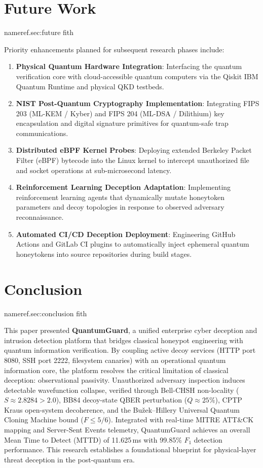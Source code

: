 \documentclass[journal,10pt]{IEEEtran}
\makeatletter
\let\orig@label\label
\def\label#1{%
  \orig@label{#1}%
  \pdfdest name{ref.#1} fith\relax
}
\makeatother
\begin{document}
\section{Future Work}\label{sec:future}
Priority enhancements planned for subsequent research phases include:
\begin{enumerate}
    \item \textbf{Physical Quantum Hardware Integration}: Interfacing the quantum verification core with cloud-accessible quantum computers via the Qiskit IBM Quantum Runtime and physical QKD testbeds.
    \item \textbf{NIST Post-Quantum Cryptography Implementation}: Integrating FIPS 203 (ML-KEM / Kyber) and FIPS 204 (ML-DSA / Dilithium) key encapsulation and digital signature primitives for quantum-safe trap communications.
    \item \textbf{Distributed eBPF Kernel Probes}: Deploying extended Berkeley Packet Filter (eBPF) bytecode into the Linux kernel to intercept unauthorized file and socket operations at sub-microsecond latency.
    \item \textbf{Reinforcement Learning Deception Adaptation}: Implementing reinforcement learning agents that dynamically mutate honeytoken parameters and decoy topologies in response to observed adversary reconnaissance.
    \item \textbf{Automated CI/CD Deception Deployment}: Engineering GitHub Actions and GitLab CI plugins to automatically inject ephemeral quantum honeytokens into source repositories during build stages.
\end{enumerate}

\section{Conclusion}\label{sec:conclusion}
This paper presented \textbf{QuantumGuard}, a unified enterprise cyber deception and intrusion detection platform that bridges classical honeypot engineering with quantum information verification. By coupling active decoy services (HTTP port 8080, SSH port 2222, filesystem canaries) with an operational quantum information core, the platform resolves the critical limitation of classical deception: observational passivity. Unauthorized adversary inspection induces detectable wavefunction collapse, verified through Bell-CHSH non-locality ($S \approx 2.8284 > 2.0$), BB84 decoy-state QBER perturbation ($Q \approx 25\%$), CPTP Kraus open-system decoherence, and the Bu\v{z}ek--Hillery Universal Quantum Cloning Machine bound ($F \le 5/6$). Integrated with real-time MITRE ATT\&CK mapping and Server-Sent Events telemetry, QuantumGuard achieves an overall Mean Time to Detect (MTTD) of 11.625\,ms with 99.85\% $F_1$ detection performance. This research establishes a foundational blueprint for physical-layer threat deception in the post-quantum era.
\end{document}
